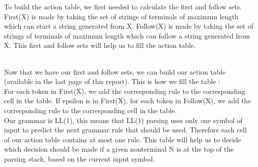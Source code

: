 \documentclass[a4paper,10pt]{report}
\begin{document}
To build the action table, we first needed to calculate the first and follow sets. First(X) is made by taking the set of strings of terminals of maximum length which can start a string generated from X. Follow(X) is made by taking the set of strings of terminals of maximum length which can follow a string generated from X. This first and follow sets will help us to fill the action table.




\hfil\\
Now that we have our first and follow sets, we can build our action table (available in the last page of this report). This is how we fill the table :\\ For each token in First(X), we add the corresponding rule to the corresponding cell in the table. If epsilon is in First(X), for each token in Follow(X), we add the corresponding rule to the corresponding cell in the table.\\
Our grammar is LL(1), this means that LL(1) parsing uses only one symbol of input to predict the next grammar rule that should be used. Therefore each cell of our action table contains at most one rule. This table will help us to decide which decision should be made if a given nonterminal N is at the top of the parsing stack, based on the current input symbol.



\end{document}
